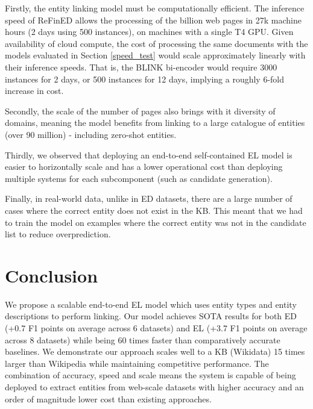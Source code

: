 \documentclass[11pt]{article}
\begin{document}
Firstly, the entity linking model must be computationally efficient. The inference speed of ReFinED allows the processing of the billion web pages in 27k machine hours (2 days using 500 instances), on machines with a single T4 GPU. Given availability of cloud compute, the cost of processing the same documents with the models evaluated in Section \ref{speed_test} would scale approximately linearly with their inference speeds. That is, the BLINK bi-encoder would require 3000 instances for 2 days, or 500 instances for 12 days, implying a roughly 6-fold increase in cost. 

Secondly, the scale of the number of pages also brings with it diversity of domains, meaning the model benefits from linking to a large catalogue of entities (over 90 million) - including zero-shot entities.

Thirdly, we observed that deploying an end-to-end self-contained EL model is easier to horizontally scale and has a lower operational cost than deploying multiple systems for each subcomponent (such as candidate generation). 

Finally, in real-world data, unlike in ED datasets, there are a large number of cases where the correct entity does not exist in the KB. This meant that we had to train the model on examples where the correct entity was not in the candidate list to reduce overprediction.


























\section{Conclusion}

We propose a scalable end-to-end EL model which uses entity types and entity descriptions to perform linking. Our model achieves SOTA results for both ED (+0.7 F1 points on average across 6 datasets) and EL (+3.7 F1 points on average across 8 datasets) while being 60 times faster than comparatively accurate baselines. We demonstrate our approach scales well to a KB (Wikidata) 15 times larger than Wikipedia while maintaining competitive performance. The combination of accuracy, speed and scale means the system is capable of being deployed to extract entities from web-scale datasets with higher accuracy and an order of magnitude lower cost than existing approaches. 
\end{document}
